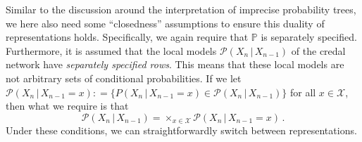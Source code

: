 \documentclass[graybox]{svmult}
\newcommand{\states}{\mathcal{X}}
\newcommand{\coloneqq}{:\!=}
\begin{document}
Similar to the discussion around the interpretation of imprecise probability trees, we here also need some ``closedness'' assumptions to ensure this duality of representations holds. Specifically, we again require that $\mathbb{P}$ is separately specified. Furthermore, it is assumed that the local models $\mathcal{P}(X_n\,\vert\,X_{n-1})$ of the credal network have \emph{separately specified rows}. This means that these local models are not arbitrary sets of conditional probabilities. If we let $\mathcal{P}(X_n\,\vert\,X_{n-1}=x)\coloneqq \bigl\{P(X_n\,\vert\,X_{n-1}=x)\in \mathcal{P}(X_n\,\vert\,X_{n-1})\bigr\}$ for all $x\in\states$, then what we require is that
\begin{equation}\label{eq:separately_specified_local}
\mathcal{P}(X_n\,\vert\,X_{n-1})=\times_{x\in\states} \mathcal{P}(X_n\,\vert\,X_{n-1}=x)\,.
\end{equation}
Under these conditions, we can straightforwardly switch between representations.
\end{document}
